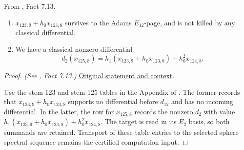 \begin{fact}
\label{paper:7.13}
From \cite{LWX126}, Fact 7.13.\par
\label{fact:x_123_9}\label{fact:x1239}
    \begin{enumerate}

   \item  $x_{123,9}+h_0x_{123,8}$ survives to the Adams $E_{12}$-page, and is not killed by any classical differential.
    \item We have a classical nonzero differential 
    $$d_2 (x_{125,8}) = h_1 (x_{123,9}+h_0x_{123,8}) + h_0^2x_{124,8}.$$
   \end{enumerate}



\end{fact}
\begin{proof}
\textit{(See \cite{LWX126}, Fact 7.13.)} \href{paper/main.tex.html#L2377}{Original statement and context}.

Use the stem-123 and stem-125 tables in the Appendix of \cite{LWX126}. The former records that $x_{123,9}+h_0x_{123,8}$ supports no differential before $d_{12}$ and has no incoming differential. In the latter, the row for $x_{125,8}$ records the nonzero $d_2$ with value $h_1(x_{123,9}+h_0x_{123,8})+h_0^2x_{124,8}$. The target is read in its $E_2$ basis, so both summands are retained. Transport of these table entries to the selected sphere spectral sequence remains the certified computation input.
\end{proof}

